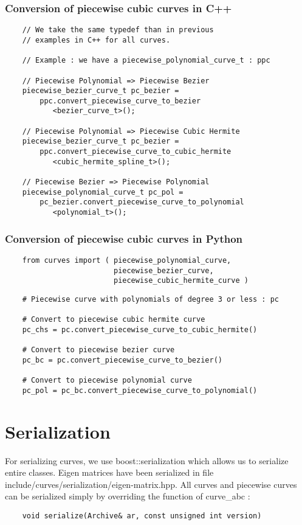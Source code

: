 \documentclass{article}
\begin{document}
    \subsubsection{Conversion of piecewise cubic curves in C++}
    \begin{lstlisting}
    // We take the same typedef than in previous
    // examples in C++ for all curves.

    // Example : we have a piecewise_polynomial_curve_t : ppc

    // Piecewise Polynomial => Piecewise Bezier
    piecewise_bezier_curve_t pc_bezier =
        ppc.convert_piecewise_curve_to_bezier
           <bezier_curve_t>();

    // Piecewise Polynomial => Piecewise Cubic Hermite
    piecewise_bezier_curve_t pc_bezier =
        ppc.convert_piecewise_curve_to_cubic_hermite
           <cubic_hermite_spline_t>();

    // Piecewise Bezier => Piecewise Polynomial
    piecewise_polynomial_curve_t pc_pol =
        pc_bezier.convert_piecewise_curve_to_polynomial
           <polynomial_t>();
    \end{lstlisting}

    \subsubsection{Conversion of piecewise cubic curves in Python}
    \begin{lstlisting}
    from curves import ( piecewise_polynomial_curve,
                         piecewise_bezier_curve,
                         piecewise_cubic_hermite_curve )
    \end{lstlisting}
    \begin{lstlisting}
    # Piecewise curve with polynomials of degree 3 or less : pc

    # Convert to piecewise cubic hermite curve
    pc_chs = pc.convert_piecewise_curve_to_cubic_hermite()

    # Convert to piecewise bezier curve
    pc_bc = pc.convert_piecewise_curve_to_bezier()

    # Convert to piecewise polynomial curve
    pc_pol = pc_bc.convert_piecewise_curve_to_polynomial()
    \end{lstlisting}

\section{Serialization}
    For serializing curves, we use boost::serialization which allows us to serialize entire classes. Eigen matrices have been serialized in file include/curves/serialization/eigen-matrix.hpp.
    All curves and piecewise curves can be serialized simply by overriding the function of curve\_abc :
    \begin{lstlisting}
    void serialize(Archive& ar, const unsigned int version)
    \end{lstlisting}
\end{document}

